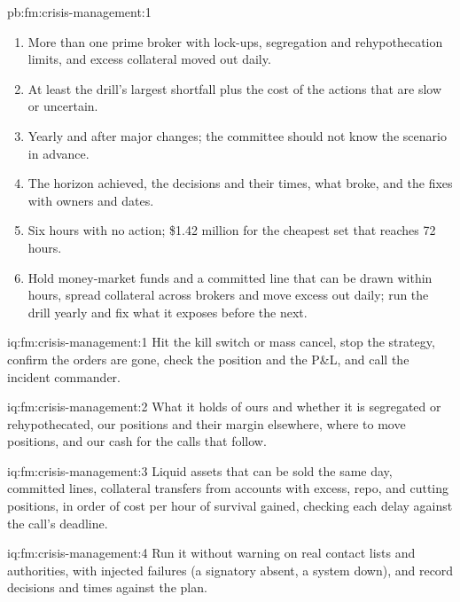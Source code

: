 \begin{solution}{pb:fm:crisis-management:1}
\begin{enumerate}
\item More than one prime broker with lock-ups, segregation and rehypothecation limits, and excess collateral moved out daily.
\item At least the drill's largest shortfall plus the cost of the actions that are slow or uncertain.
\item Yearly and after major changes; the committee should not know the scenario in advance.
\item The horizon achieved, the decisions and their times, what broke, and the fixes with owners and dates.
\item Six hours with no action; \$1.42 million for the cheapest set that reaches 72 hours.
\item Hold money-market funds and a committed line that can be drawn within hours, spread collateral across brokers and move excess out daily;
run the drill yearly and fix what it exposes before the next.
\end{enumerate}
\end{solution}

\begin{solution}{iq:fm:crisis-management:1}
Hit the kill switch or mass cancel, stop the strategy, confirm the orders are gone, check the position and the P\&L, and call the incident commander.
\end{solution}

\begin{solution}{iq:fm:crisis-management:2}
What it holds of ours and whether it is segregated or rehypothecated, our positions and their margin elsewhere, where to move positions, and our cash
for the calls that follow.
\end{solution}

\begin{solution}{iq:fm:crisis-management:3}
Liquid assets that can be sold the same day, committed lines, collateral transfers from accounts with excess, repo, and cutting positions, in
order of cost per hour of survival gained, checking each delay against the call's deadline.
\end{solution}

\begin{solution}{iq:fm:crisis-management:4}
Run it without warning on real contact lists and authorities, with injected failures (a signatory absent, a system down), and record decisions and
times against the plan.
\end{solution}

